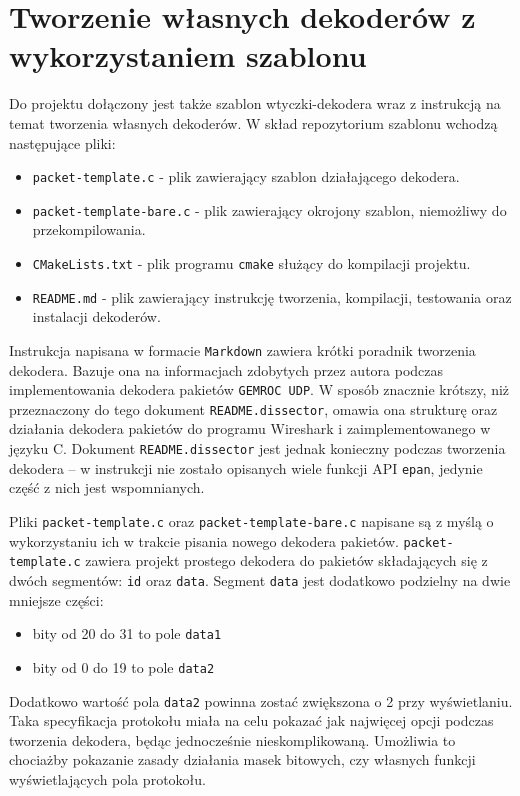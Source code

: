 \documentclass[a4paper, 12pt, twoside, openright]{article}
\begin{document}
\newpage
\section{Tworzenie własnych dekoderów z wykorzystaniem szablonu}

	Do projektu dołączony jest także szablon wtyczki-dekodera wraz z instrukcją na temat tworzenia własnych dekoderów.
	W skład repozytorium szablonu wchodzą następujące pliki:
	\begin{itemize}
		\item \texttt{packet-template.c} - plik zawierający szablon działającego dekodera.
		\item \texttt{packet-template-bare.c} - plik zawierający okrojony szablon, niemożliwy do przekompilowania.
		\item \texttt{CMakeLists.txt} - plik programu \texttt{cmake} służący do kompilacji projektu.
		\item \texttt{README.md} - plik zawierający instrukcję tworzenia, kompilacji, testowania oraz instalacji dekoderów.
	\end{itemize}

	Instrukcja napisana w formacie \texttt{Markdown} zawiera krótki poradnik tworzenia dekodera. Bazuje ona na informacjach
	zdobytych przez autora podczas implementowania dekodera pakietów \texttt{GEMROC UDP}. W sposób znacznie krótszy,
	niż przeznaczony do tego dokument \texttt{README.dissector}, omawia ona strukturę oraz działania dekodera pakietów
	do programu Wireshark i zaimplementowanego w języku C. Dokument \texttt{README.dissector} jest jednak konieczny podczas
	tworzenia dekodera -- w instrukcji nie zostało opisanych wiele funkcji API \texttt{epan}, jedynie część z nich jest
	wspomnianych.

	Pliki \texttt{packet-template.c} oraz \texttt{packet-template-bare.c} napisane są z myślą o wykorzystaniu ich w trakcie
	pisania nowego dekodera pakietów. \texttt{packet-template.c} zawiera projekt prostego dekodera do pakietów składających
	się z dwóch segmentów: \texttt{id} oraz \texttt{data}. Segment \texttt{data} jest dodatkowo podzielny na dwie mniejsze
	części:
	\begin{itemize}
		\item bity od 20 do 31 to pole \texttt{data1}
		\item bity od 0 do 19 to pole \texttt{data2}
	\end{itemize}

	Dodatkowo wartość pola \texttt{data2} powinna zostać zwiększona o 2 przy wyświetlaniu. Taka specyfikacja protokołu
	miała na celu pokazać jak najwięcej opcji podczas tworzenia dekodera, będąc jednocześnie nieskomplikowaną.
	Umożliwia to chociażby pokazanie zasady działania masek bitowych, czy własnych funkcji wyświetlających pola protokołu.
\end{document}
